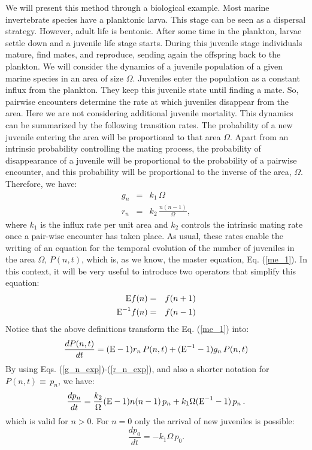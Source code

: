 We will present this method through a biological example. Most marine invertebrate species have a planktonic larva. This stage can be seen as a dispersal strategy. However, adult life is bentonic. After some time in the plankton, larvae settle down and a juvenile life stage starts. During this juvenile stage individuals mature, find mates, and reproduce, sending again the offspring back to the plankton. We will consider the dynamics of a juvenile population of a given marine species in an area of size $\Omega$. Juveniles enter the population as a constant influx from the plankton. They keep this juvenile state until finding a mate. So, pairwise encounters determine the rate at which juveniles disappear from the area. Here we are not considering additional juvenile mortality. This dynamics can be summarized by the following transition rates. The probability of a new juvenile entering the area will be proportional to that area $\Omega$. Apart from an intrinsic probability controlling the mating process, the probability of disappearance of a juvenile will be proportional to the probability of a pairwise encounter, and this probability will be proportional to the inverse of the area, $\Omega$. 
Therefore, we have:
\begin{eqnarray}
\label{g_n_exp}
g_n &=& k_{1}\,\Omega\\
r_n &=& k_{2}\,\frac{n(n-1)}{\Omega},
\label{r_n_exp}
\end{eqnarray}
where $k_{1}$ is the influx rate per unit area and $k_{2}$ controls the intrinsic mating rate once a pair-wise encounter has taken place. As usual, these rates enable the writing of an equation for the temporal evolution of the number of juveniles in the area $\Omega$, $P(n,t)$, which is, as we know, the master equation, Eq. (\ref{me_1}). In this context, it will be very useful to introduce two operators that simplify this equation:
\begin{eqnarray}
\label{E_1}
\textup{E}f(n)      &=& f(n+1)\\
\textup{E}^{-1}f(n) &=& f(n-1)
\label{E_2}
\end{eqnarray}
Notice that the above definitions transform the Eq. (\ref{me_1}) into:
\begin{equation}
\label{me_E}
\frac{dP(n,t)}{dt}=(\textup{E}-1)r_n\,P(n,t) + (\textup{E}^{-1}-1)g_n\,P(n,t)
\end{equation}  
By using Eqs. (\ref{g_n_exp})-(\ref{r_n_exp}), and also a shorter notation for 
$P(n,t)\equiv\,p_n$, we have:
\begin{equation}
\label{me_E}
\frac{dp_n}{dt}=\frac{k_2}{\Omega}(\textup{E}-1)n(n-1)\,p_n + k_{1}\Omega(\textup{E}^{-1}-1)\,p_n\,.
\end{equation}  
which is valid for $n>0$. For $n=0$ only the arrival of new juveniles is possible:
\begin{equation}
\frac{dp_0}{dt}= -k_{1}\Omega\,p_0.
\end{equation}
\smallskip

